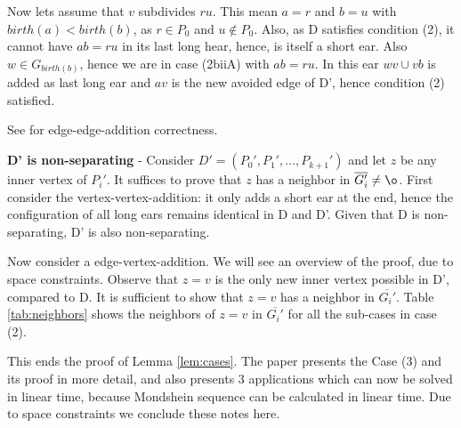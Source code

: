Now lets assume that $v$ subdivides $ru$.
This mean $a=r$ and $b=u$ with $birth(a) < birth(b)$, as $r \in P_0$ and $u \notin P_0$.
Also, as D satisfies condition (2), it cannot have $ab=ru$ in its last long hear, hence, is itself a short ear.
Also $w \in G_{birth(b)}$, hence we are in case (2biiA) with $ab = ru$.
In this ear $wv \cup vb$ is added as last long ear and $av$ is the new avoided edge of D', hence condition (2) satisfied.

See \cite{Schmidt13a} for edge-edge-addition correctness.

\medskip
\textbf{D' is non-separating} - Consider $D' = (P_0', P_1', ... ,P_{k+1}')$ and let $z$ be any inner vertex of $P_i'$.
It suffices to prove that $z$ has a neighbor in $\overline{G_i'} \neq \o$.
First consider the vertex-vertex-addition: it only adds a short ear at the end, hence the configuration of all long ears remains identical in D and D'.
Given that D is non-separating, D' is also non-separating.

Now consider a edge-vertex-addition.
We will see an overview of the proof, due to space constraints.
Observe that $z=v$ is the only new inner vertex possible in D', compared to D.
It is sufficient to show that $z=v$ has a neighbor in $\overline{G_i'}$.
Table \ref{tab:neighbors} shows the neighbors of $z=v$ in $\overline{G_i'}$ for all the sub-cases in case (2).


\begin{table} \label{tab:neighbors}
  \centering  
    \caption{Neighbors of $v \in inner(P_i')$ in $\overline{G_i'}$}
  \end{table}


\medskip

This ends the proof of Lemma \ref{lem:cases}.
The paper \cite{Schmidt13a} presents the Case (3) and its proof in more detail, and also presents 3 applications which can now be solved in linear time, because Mondshein sequence can be calculated in linear time. Due to space constraints we conclude these notes here.
